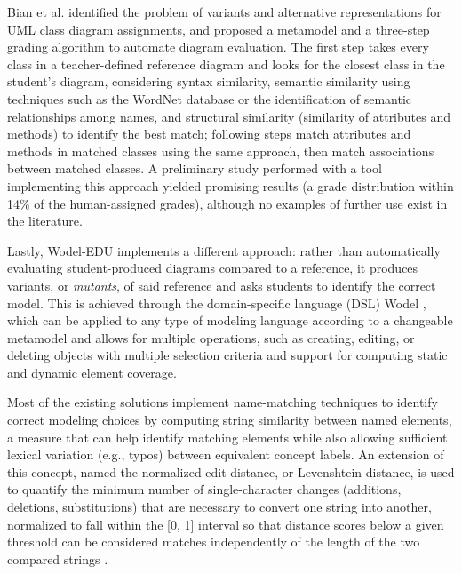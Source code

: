 Bian et al. \cite{bian2019automated} identified the problem of variants and alternative representations for UML class diagram assignments, and proposed a metamodel and a three-step grading algorithm to automate diagram evaluation. The first step takes every class in a teacher-defined reference diagram and looks for the closest class in the student's diagram, considering syntax similarity, semantic similarity using techniques such as the WordNet database \cite{miller1995wordnet} or the identification of semantic relationships among names, and structural similarity (similarity of attributes and methods) to identify the best match; following steps match attributes and methods in matched classes using the same approach, then match associations between matched classes. A preliminary study performed with a tool implementing this approach yielded promising results (a grade distribution within 14\% of the human-assigned grades), although no examples of further use exist in the literature.

Lastly, Wodel-EDU \cite{gomezabajo2017dsl} implements a different approach: rather than automatically evaluating student-produced diagrams compared to a reference, it produces variants, or \textit{mutants}, of said reference and asks students to identify the correct model. This is achieved through the domain-specific language (DSL) Wodel \cite{gomezabajo2016wodel}, which can be applied to any type of modeling language according to a changeable metamodel and allows for multiple operations, such as creating, editing, or deleting objects with multiple selection criteria and support for computing static and dynamic element coverage. 

Most of the existing solutions implement name-matching techniques to identify correct modeling choices by computing string similarity between named elements, a measure that can help identify matching elements while also allowing sufficient lexical variation (e.g., typos) between equivalent concept labels. An extension of this concept, named the normalized edit distance, or Levenshtein distance, is used to quantify the minimum number of single-character changes (additions, deletions, substitutions) that are necessary to convert one string into another, normalized to fall within the [0, 1] interval so that distance scores below a given threshold can be considered matches independently of the length of the two compared strings \cite{navarro2001guided}.

